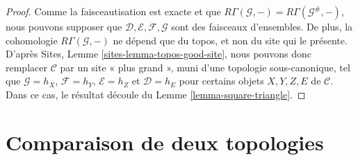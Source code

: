 \begin{proof}
Comme la faisceautisation est exacte et que
$R\Gamma(\mathcal{G}, -) = R\Gamma(\mathcal{G}^\#, -)$, nous pouvons
supposer que $\mathcal{D}, \mathcal{E}, \mathcal{F}, \mathcal{G}$ sont des
faisceaux d'ensembles. De plus, la cohomologie
$R\Gamma(\mathcal{G}, -)$ ne dépend que du topos, et non du site qui le
présente. D'après Sites, Lemme \ref{sites-lemma-topos-good-site}, nous
pouvons donc remplacer $\mathcal{C}$ par un site « plus grand », muni d'une
topologie sous-canonique, tel que $\mathcal{G} = h_X$,
$\mathcal{F} = h_Y$, $\mathcal{E} = h_Z$ et $\mathcal{D} = h_E$ pour
certains objets $X, Y, Z, E$ de $\mathcal{C}$. Dans ce cas, le résultat
découle du Lemme \ref{lemma-square-triangle}.
\end{proof}







\section{Comparaison de deux topologies}
\label{section-compare}


